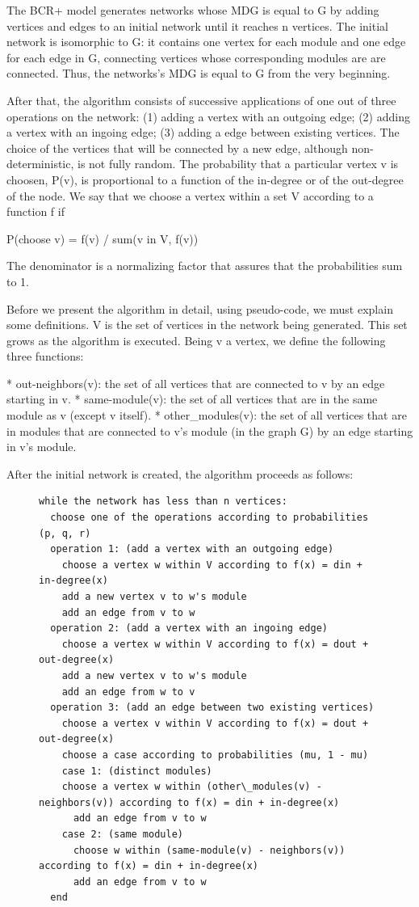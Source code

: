 The BCR+ model generates networks whose MDG is equal to G by adding vertices and
edges to an initial network until it reaches n vertices. The initial network is
isomorphic to G: it contains one vertex for each module and one edge for each
edge in G, connecting vertices whose corresponding modules are are connected.
Thus, the networks's MDG is equal to G from the very beginning.

After that, the algorithm consists of successive applications of one out of
three operations on the network: (1) adding a vertex with an outgoing edge; (2)
adding a vertex with an ingoing edge; (3) adding a edge between existing
vertices. The choice of the vertices that will be connected by a new edge,
although non-deterministic, is not fully random. The probability that a
particular vertex v is choosen, P(v), is proportional to a function of the
in-degree or of the out-degree of the node. We say that we choose a vertex
within a set V according to a function f if

  P(choose v) = f(v) / sum(v in V, f(v))

The denominator is a normalizing factor that assures that the probabilities sum
to 1.

Before we present the algorithm in detail, using pseudo-code, we must explain
some definitions. V is the set of vertices in the network being generated. This
set grows as the algorithm is executed. Being v a vertex, we define the
following three functions:

* out-neighbors(v): the set of all vertices that are connected to v by an edge
starting in v.
* same-module(v): the set of all vertices that are in the same module as v (except
v itself).
* other\_modules(v): the set of all vertices that are in modules that are connected
to v's module (in the graph G) by an edge starting in v's module.

After the initial network is created, the algorithm proceeds as follows:

\begin{figure}
\begin{verbatim}
while the network has less than n vertices:
  choose one of the operations according to probabilities (p, q, r)
  operation 1: (add a vertex with an outgoing edge)
    choose a vertex w within V according to f(x) = din + in-degree(x)
    add a new vertex v to w's module
    add an edge from v to w
  operation 2: (add a vertex with an ingoing edge)
    choose a vertex w within V according to f(x) = dout + out-degree(x)
    add a new vertex v to w's module
    add an edge from w to v
  operation 3: (add an edge between two existing vertices)
    choose a vertex v within V according to f(x) = dout + out-degree(x)
    choose a case according to probabilities (mu, 1 - mu)
    case 1: (distinct modules)
  	choose a vertex w within (other\_modules(v) - neighbors(v)) according to f(x) = din + in-degree(x)
      add an edge from v to w
    case 2: (same module)
      choose w within (same-module(v) - neighbors(v)) according to f(x) = din + in-degree(x)
      add an edge from v to w
  end
\end{verbatim}
\end{figure}

